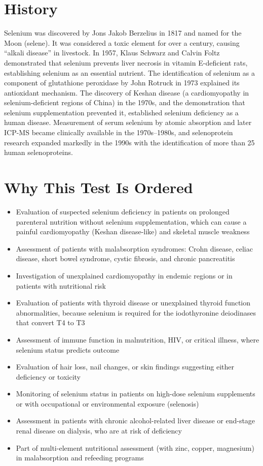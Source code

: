 \section*{History}
Selenium was discovered by Jons Jakob Berzelius in 1817 and named for the Moon (selene). It was considered a toxic element for over a century, causing ``alkali disease'' in livestock. In 1957, Klaus Schwarz and Calvin Foltz demonstrated that selenium prevents liver necrosis in vitamin E-deficient rats, establishing selenium as an essential nutrient. The identification of selenium as a component of glutathione peroxidase by John Rotruck in 1973 explained its antioxidant mechanism. The discovery of Keshan disease (a cardiomyopathy in selenium-deficient regions of China) in the 1970s, and the demonstration that selenium supplementation prevented it, established selenium deficiency as a human disease. Measurement of serum selenium by atomic absorption and later ICP-MS became clinically available in the 1970s--1980s, and selenoprotein research expanded markedly in the 1990s with the identification of more than 25 human selenoproteins.

\section*{Why This Test Is Ordered}
\begin{itemize}
  \item Evaluation of suspected selenium deficiency in patients on prolonged parenteral nutrition without selenium supplementation, which can cause a painful cardiomyopathy (Keshan disease-like) and skeletal muscle weakness
  \item Assessment of patients with malabsorption syndromes: Crohn disease, celiac disease, short bowel syndrome, cystic fibrosis, and chronic pancreatitis
  \item Investigation of unexplained cardiomyopathy in endemic regions or in patients with nutritional risk
  \item Evaluation of patients with thyroid disease or unexplained thyroid function abnormalities, because selenium is required for the iodothyronine deiodinases that convert T4 to T3
  \item Assessment of immune function in malnutrition, HIV, or critical illness, where selenium status predicts outcome
  \item Evaluation of hair loss, nail changes, or skin findings suggesting either deficiency or toxicity
  \item Monitoring of selenium status in patients on high-dose selenium supplements or with occupational or environmental exposure (selenosis)
  \item Assessment in patients with chronic alcohol-related liver disease or end-stage renal disease on dialysis, who are at risk of deficiency
  \item Part of multi-element nutritional assessment (with zinc, copper, magnesium) in malabsorption and refeeding programs
\end{itemize}

